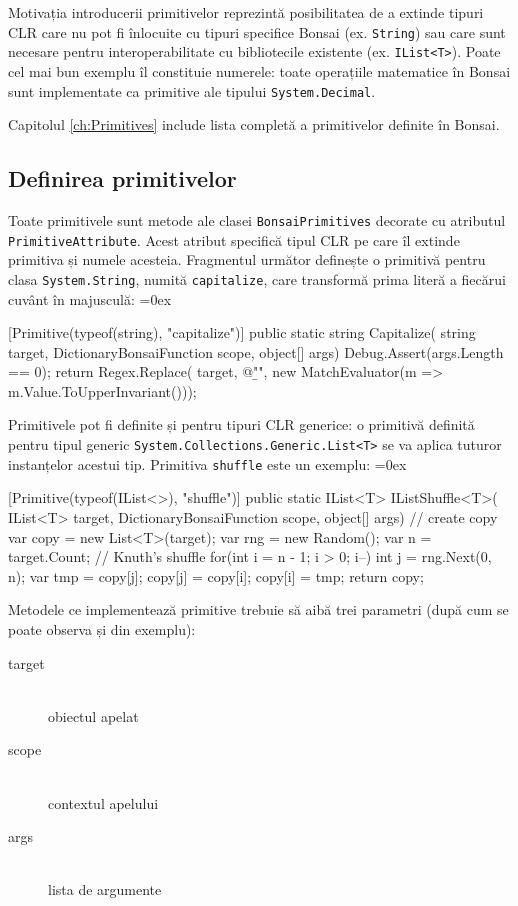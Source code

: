 \documentclass[12pt,a4paper]{memoir}
\renewcommand{\c}{\texttt}
\newenvironment{code}
{
\definecolor{shadecolor}{gray}{0.91}
\topsep=0ex
\relax
\shaded
\verbatim
}
{
\endverbatim
\endshaded
}
\begin{document}
Motivația introducerii primitivelor reprezintă posibilitatea de a extinde tipuri CLR care nu pot fi înlocuite cu tipuri specifice Bonsai (ex. \c{String}) sau care sunt necesare pentru interoperabilitate cu bibliotecile existente (ex. \c{IList<T>}). Poate cel mai bun exemplu îl constituie numerele: toate operațiile matematice în Bonsai sunt implementate ca primitive ale tipului \c{System.Decimal}.

Capitolul \ref{ch:Primitives} include lista completă a primitivelor definite în Bonsai.

\subsection{Definirea primitivelor}

Toate primitivele sunt metode ale clasei \c{BonsaiPrimitives} decorate cu atributul \c{PrimitiveAttribute}. Acest atribut specifică tipul CLR pe care îl extinde primitiva și numele acesteia. Fragmentul următor definește o primitivă pentru clasa \c{System.String}, numită \c{capitalize}, care transformă prima literă a fiecărui cuvânt în majusculă:
\begin{code}
[Primitive(typeof(string), "capitalize")]
public static string Capitalize(
  string target,
  DictionaryBonsaiFunction scope,
  object[] args)
{
  Debug.Assert(args.Length == 0);
  return Regex.Replace(
    target, @"\b\w",
    new MatchEvaluator(m => m.Value.ToUpperInvariant()));
}
\end{code}

Primitivele pot fi definite și pentru tipuri CLR generice: o primitivă definită pentru tipul generic \c{System.Collections.Generic.List<T>} se va aplica tuturor instanțelor acestui tip. Primitiva \c{shuffle} este un exemplu:
\begin{code}
[Primitive(typeof(IList<>), "shuffle")]
public static IList<T> IListShuffle<T>(
  IList<T> target,
  DictionaryBonsaiFunction scope,
  object[] args)
{
  // create copy
  var copy = new List<T>(target);
  var rng = new Random();
  var n = target.Count;
  // Knuth's shuffle
  for(int i = n - 1; i > 0; i--) {
    int j = rng.Next(0, n);
    var tmp = copy[j];
    copy[j] = copy[i];
    copy[i] = tmp;
  }
  return copy;
}
\end{code}

Metodele ce implementează primitive trebuie să aibă trei parametri (după cum se poate observa și din exemplu):
\begin{description}
\item[target]\hfill\\ obiectul apelat
\item[scope]\hfill\\ contextul apelului
\item[args]\hfill\\ lista de argumente
\end{description}
\end{document}
